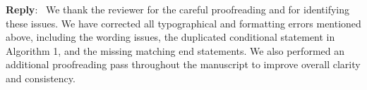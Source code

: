 \documentclass[12pt]{article}
\newcommand{\0}{\mathbf{0}}
\newcounter{reviewer}
\newenvironment{reply}
   {\medskip \noindent \begin{sf}\color{Blue}\textbf{Reply}:\  }
   {\medskip \end{sf}}
\begin{document}
\begin{reply}
We thank the reviewer for the careful proofreading and for identifying these issues. We have corrected all typographical and formatting errors mentioned above, including the wording issues, the duplicated conditional statement in Algorithm 1, and the missing matching end statements. We also performed an additional proofreading pass throughout the manuscript to improve overall clarity and consistency.
\end{reply}
\end{document}
